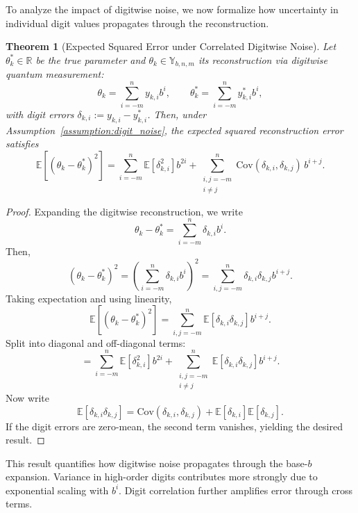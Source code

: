 \documentclass[aps,twocolumn,superscriptaddress,nofootinbib]{revtex4}
\newtheorem{theorem}{Theorem}
\begin{document}
To analyze the impact of digitwise noise, we now formalize how uncertainty in individual digit values propagates through the reconstruction.

\begin{theorem}[Expected Squared Error under Correlated Digitwise Noise]\label{thm:noise}
Let \( \theta_k^* \in \mathbb{R} \) be the true parameter and \( \theta_k \in \mathbb{Y}_{b,n,m} \) its reconstruction via digitwise quantum measurement:
\begin{equation}
    \theta_k = \sum_{i=-m}^{n} y_{k,i} b^i, \qquad \theta_k^* = \sum_{i=-m}^{n} y^*_{k,i} b^i,
\end{equation}
with digit errors \( \delta_{k,i} := y_{k,i} - y^*_{k,i} \). Then, under Assumption~\ref{assumption:digit_noise}, the expected squared reconstruction error satisfies
\begin{equation}
    \mathbb{E}\left[ (\theta_k - \theta_k^*)^2 \right] = 
    \sum_{i=-m}^{n} \mathbb{E}[\delta_{k,i}^2] b^{2i}
    + \sum_{\substack{i,j=-m \\ i \neq j}}^{n} \text{Cov}(\delta_{k,i}, \delta_{k,j}) \, b^{i+j}.
\end{equation}
\end{theorem}

\begin{proof}
Expanding the digitwise reconstruction, we write
\[
\theta_k - \theta_k^* = \sum_{i=-m}^{n} \delta_{k,i} b^i.
\]
Then,
\[
(\theta_k - \theta_k^*)^2 = \left( \sum_{i=-m}^{n} \delta_{k,i} b^i \right)^2 
= \sum_{i,j=-m}^{n} \delta_{k,i} \delta_{k,j} b^{i+j}.
\]
Taking expectation and using linearity,
\[
\mathbb{E}\left[ (\theta_k - \theta_k^*)^2 \right] = \sum_{i,j=-m}^{n} \mathbb{E}[\delta_{k,i} \delta_{k,j}] b^{i+j}.
\]
Split into diagonal and off-diagonal terms:
\[
= \sum_{i=-m}^{n} \mathbb{E}[\delta_{k,i}^2] b^{2i}
+ \sum_{\substack{i,j=-m \\ i \neq j}}^{n} \mathbb{E}[\delta_{k,i} \delta_{k,j}] b^{i+j}.
\]
Now write
\[
\mathbb{E}[\delta_{k,i} \delta_{k,j}] = \text{Cov}(\delta_{k,i}, \delta_{k,j}) + \mathbb{E}[\delta_{k,i}]\mathbb{E}[\delta_{k,j}].
\]
If the digit errors are zero-mean, the second term vanishes, yielding the desired result.
\end{proof}

This result quantifies how digitwise noise propagates through the base-$b$ expansion. Variance in high-order digits contributes more strongly due to exponential scaling with $b^i$. Digit correlation further amplifies error through cross terms. 
\end{document}
